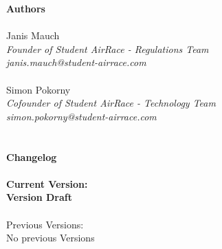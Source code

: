 
\newpage
{\bf Authors}
\\ \\Janis Mauch \emph{\\Founder of Student AirRace - Regulations Team \\janis.mauch@student-airrace.com}
\\ \\ Simon Pokorny \emph{\\Cofounder of Student AirRace - Technology Team \\simon.pokorny@student-airrace.com}
\\ \\ \\
{\bf Changelog}
\\ \\{\bf Current Version: \\Version Draft \getVersion{}}
\\ \\Previous Versions: \\ No previous Versions


